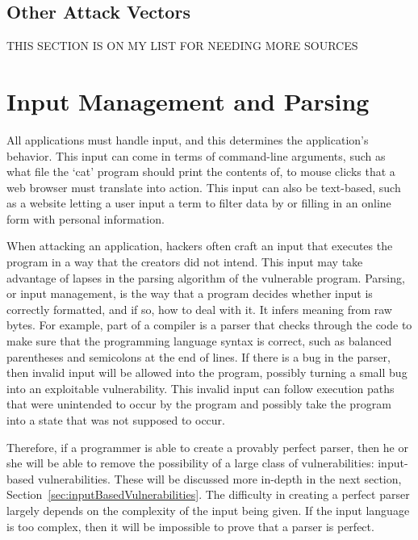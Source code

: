 \subsection{Other Attack Vectors}
\label{sec:otherAttackVectors}
THIS SECTION IS ON MY LIST FOR NEEDING MORE SOURCES

\section{Input Management and Parsing}
\label{sec:inputManagement}
All applications must handle input, and this determines the application's behavior.  This input can come in terms of command-line arguments, such as what file the `cat' program should print the contents of, to mouse clicks that a web browser must translate into action.  This input can also be text-based, such as a website letting a user input a term to filter data by or filling in an online form with personal information.

When attacking an application, hackers often craft an input that executes the program in a way that the creators did not intend.  This input may take advantage of lapses in the parsing algorithm of the vulnerable program.  Parsing, or input management, is the way that a program decides whether input is correctly formatted, and if so, how to deal with it.  It infers meaning from raw bytes.  For example, part of a compiler is a parser that checks through the code to make sure that the programming language syntax is correct, such as balanced parentheses and semicolons at the end of lines.  If there is a bug in the parser, then invalid input will be allowed into the program, possibly turning a small bug into an exploitable vulnerability.  This invalid input can follow execution paths that were unintended to occur by the program and possibly take the program into a state that was not supposed to occur.

Therefore, if a programmer is able to create a provably perfect parser, then he or she will be able to remove the possibility of a large class of vulnerabilities: input-based vulnerabilities.  These will be discussed more in-depth in the next section, Section~\ref{sec:inputBasedVulnerabilities}.  The difficulty in creating a perfect parser largely depends on the complexity of the input being given.  If the input language is too complex, then it will be impossible to prove that a parser is perfect.

